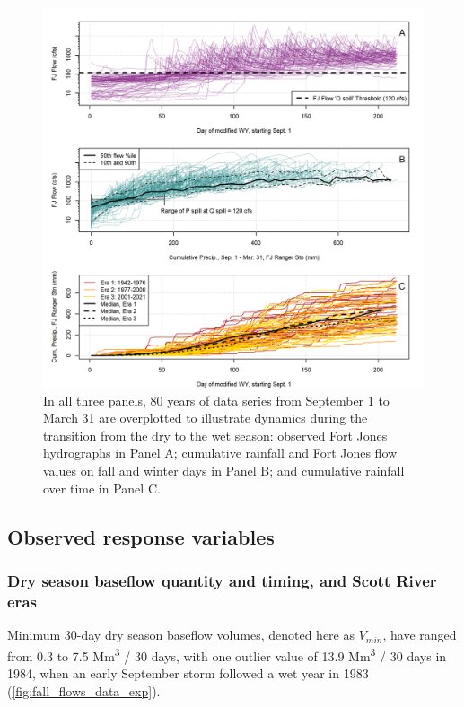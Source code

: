 \documentclass[hess, manuscript]{copernicus}
\begin{document}
\begin{figure}
\includegraphics[width=1\linewidth]{f05} \caption{\label{fig:time_v_fall_rains_v_flow_fig} In all three panels, 80 years of data series from September 1 to March 31 are overplotted to illustrate dynamics during the transition from the dry to the wet season: observed Fort Jones hydrographs in Panel A; cumulative rainfall and Fort Jones flow values on fall and winter days in Panel B; and cumulative rainfall over time in Panel C.}\label{fig:time_v_fall_rains_v_flow_fig}
\end{figure}

\subsection{Observed response variables}

\subsubsection{Dry season baseflow quantity and timing, and Scott River
eras}

Minimum 30-day dry season baseflow volumes, denoted here as \(V_{min}\),
have ranged from 0.3 to 7.5 Mm\textsuperscript{3} / 30 days, with one
outlier value of 13.9 Mm\textsuperscript{3} / 30 days in 1984, when an
early September storm followed a wet year in 1983
(\autoref{fig:fall_flows_data_exp}).
\end{document}
